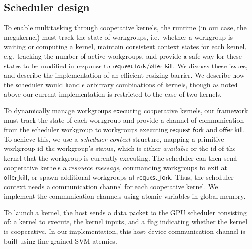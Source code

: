 \documentclass[parskip=half,sigconf,review, anonymous=true, acmcopyrightmode=none]{acmart}
\newcommand{\offerfork}{\mathsf{request\_fork}}
\newcommand{\offerkill}{\mathsf{offer\_kill}}
\newcommand{\getgroupid}{\mathsf{get\_group\_id}}
\newcommand{\getnumgroups}{\mathsf{get\_num\_groups}}
\begin{document}
\subsection{Scheduler design}\label{sec:resizingbarrier}\label{sec:schedulerimpl}

To enable multitasking through cooperative kernels, the runtime (in
our case, the megakernel) must track the state of workgroups,
i.e.\ whether a workgroup is waiting or computing a kernel, maintain
consistent context states for each kernel, e.g.\ tracking the number
of active workgroups, and provide a safe way for these states to be
modified in response to $\offerfork$/$\offerkill$. We discuss these
issues, and describe the implementation of an efficient resizing
barrier. We describe how the scheduler would handle arbitrary
combinations of kernels, though as noted above our current
implementation is restricted to the case of two kernels.

%
%
To dynamically manage workgroups executing cooperative kernels, our
framework must track the state of each workgroup and provide a channel
of communication from the scheduler workgroup to workgroups executing
$\offerfork$ and $\offerkill$. To achieve this, we use a
\emph{scheduler context} structure, mapping a primitive workgroup id
the workgroup's status, which is either \emph{available} or the id of
the kernel that the workgroup is currently executing.  The scheduler
can then send cooperative kernels a \emph{resource message},
commanding workgroups to exit at $\offerkill$, or spawn additional
workgroups at $\offerfork$. Thus, the scheduler context needs a
communication channel for each cooperative kernel. We implement the
communication channels using atomic variables in global memory.

%
To launch a kernel, the host sends a data packet to the GPU scheduler
consisting of: a kernel to execute, the kernel inputs, and a flag
indicating whether the kernel is cooperative. In our implementation,
this host-device communication channel is built using fine-grained SVM
atomics.
\end{document}
